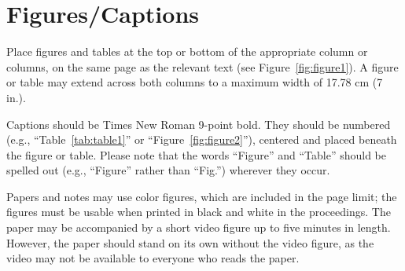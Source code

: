 \section{Figures/Captions}

Place figures and tables at the top or bottom of the appropriate
                                column or columns, on the same page as the relevant text
                                (see Figure~\ref{fig:figure1}). A figure or table may extend across both
                                columns to a maximum width of 17.78 cm (7 in.).

Captions should be Times New Roman 9-point bold.  They should be numbered (e.g.,
                                ``Table~\ref{tab:table1}'' or ``Figure~\ref{fig:figure2}''), centered
                                and placed beneath the figure or table.  Please note that the words
                                ``Figure'' and ``Table'' should be spelled out (e.g., ``Figure''
                                rather than ``Fig.'') wherever they occur.

Papers and notes may use color figures, which are included in the page
                                limit; the figures must be usable when printed in black and white in
                                the proceedings.  The paper may be accompanied by a short video figure
                                up to five minutes in length.  However, the paper should stand on its
                                own without the video figure, as the video may not be available to
                                everyone who reads the paper.